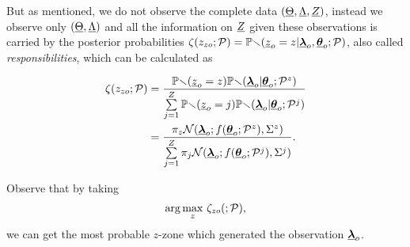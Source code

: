 \documentclass{ifacconf}  %
\begin{document}
But as mentioned, we do not observe the complete data $(\underline{\Theta},\underline{\Lambda},\underline{Z})$, instead we observe only $(\underline{\Theta},\underline{\Lambda})$ and all the information on $\underline{Z}$ given these observations is carried by the posterior probabilities  ${\zeta(z_{zo};\mathcal{P})=\mathbb{Pr}(\underline{z}_{o}=z|{\underline{\boldsymbol{\lambda}}}_{o},{\underline{\boldsymbol{\theta}}}_{o};\mathcal{P})}$, also called \emph{responsibilities}, which can be calculated as

\begin{align}
  \label{eq:responsibilities}
\zeta(z_{zo};\mathcal{P})&=\frac{\mathbb{Pr}(\underline{z}_{o}=z)\mathbb{Pr}({\underline{\boldsymbol{\lambda}}}_{o}|{\underline{\boldsymbol{\theta}}}_{o};\mathcal{P}^{z})}{\sum\limits_{j=1}^{Z}\mathbb{Pr}(\underline{z}_{o}=j)\mathbb{Pr}({\underline{\boldsymbol{\lambda}}}_{o}|{\underline{\boldsymbol{\theta}}}_{o};\mathcal{P}^{j})}\nonumber\\
  &=\frac{\pi_{z}{\mathcal{N}({\underline{\boldsymbol{\lambda}}}_{o};f({\underline{\boldsymbol{\theta}}}_{o};\mathcal{P}^{z}),{\Sigma^{z}})}}{\sum\limits_{j=1}^{Z}\pi_{j}\mathcal{N}({\underline{\boldsymbol{\lambda}}}_{o};f({\underline{\boldsymbol{\theta}}}_{o};\mathcal{P}^{j}),{\Sigma^{j}})}.
\end{align}

Observe that by taking
\begin{equation}\label{eq:argmaxz}
\arg\underset{z}{\max}\ {\zeta_{zo}(;\mathcal{P})},
\end{equation}
we can get the most probable $z$-zone which generated the observation ${\underline{\boldsymbol{\lambda}}}_{o}$.
\end{document}
